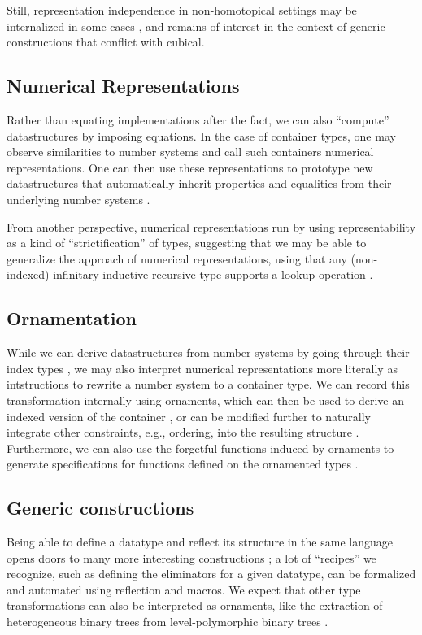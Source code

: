 \documentclass{article}
\theoremstyle{plain}%
\theoremstyle{definition}
\begin{document}
Still, representation independence in non-homotopical settings may be internalized in some cases \cite{tgalois}, and remains of interest in the context of generic constructions that conflict with cubical.

\subsection{Numerical Representations}
Rather than equating implementations after the fact, we can also ``compute'' datastructures by imposing equations. In the case of container types, one may observe similarities to number systems \cite{purelyfunctional} and call such containers numerical representations. One can then use these representations to prototype new datastructures that automatically inherit properties and equalities from their underlying number systems \cite{calcdata}.

From another perspective, numerical representations run by using representability as a kind of ``strictification'' of types, suggesting that we may be able to generalize the approach of numerical representations, using that any (non-indexed) infinitary inductive-recursive type supports a lookup operation \cite{glookup}.


\subsection{Ornamentation}
While we can derive datastructures from number systems by going through their index types \cite{calcdata}, we may also interpret numerical representations more literally as intstructions to rewrite a number system to a container type. We can record this transformation internally using ornaments, which can then be used to derive an indexed version of the container \cite{algorn}, or can be modified further to naturally integrate other constraints, e.g., ordering, into the resulting structure \cite{progorn}. Furthermore, we can also use the forgetful functions induced by ornaments to generate specifications for functions defined on the ornamented types \cite{orntrans}.

\subsection{Generic constructions}
Being able to define a datatype and reflect its structure in the same language opens doors to many more interesting constructions \cite{practgen}; a lot of ``recipes'' we recognize, such as defining the eliminators for a given datatype, can be formalized and automated using reflection and macros. We expect that other type transformations can also be interpreted as ornaments, like the extraction of heterogeneous binary trees from level-polymorphic binary trees \cite{hetbin}. 
\end{document}
